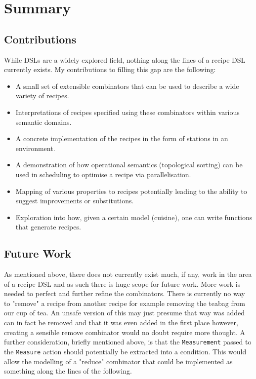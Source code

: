 \documentclass[11pt]{article}
\begin{document}
\section{Summary}

\subsection{Contributions}

While DSLs are a widely explored field, nothing along the lines of a recipe DSL
currently exists. My contributions to filling this gap are the following:

\begin{itemize}
    \item A small set of extensible combinators that can be used to describe a wide variety of recipes.

    \item Interpretations of recipes specified using these combinators within various semantic domains.

    \item A concrete implementation of the recipes in the form of stations in an environment.

    \item A demonstration of how operational semantics (topological sorting) can be used in
    scheduling to optimise a recipe via parallelisation.

    \item Mapping of various properties to recipes potentially leading to the ability
    to suggest improvements or substitutions.

    \item Exploration into how, given a certain model (cuisine), one can write functions that
    generate recipes.
\end{itemize}

\subsection{Future Work}

As mentioned above, there does not currently exist much, if any, work in the area of
a recipe DSL and as such there is huge scope for future work. More work is needed
to perfect and further refine the combinators. There is currently no way to
"remove" a recipe from another recipe for example removing the teabag from our cup of tea.
An unsafe version of this may just presume that way was added can in fact be removed
and that it was even added in the first place however, creating a sensible remove
combinator would no doubt require more thought. A further consideration, briefly mentioned
above, is that the \texttt{Measurement} passed to the \texttt{Measure} action should
potentially be extracted into a condition. This would allow the modelling of a "reduce"
combinator that could be implemented as something along the lines of the following.
\end{document}
